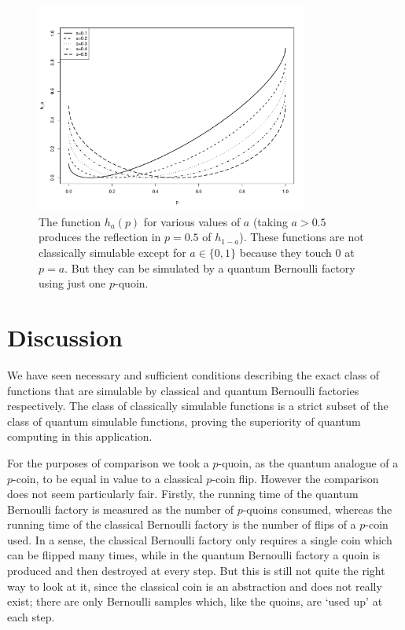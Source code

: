 \documentclass{article}
\theoremstyle{definition}
\begin{document}
\begin{figure}
\centering
\includegraphics[width=0.8\textwidth]{function_ha.pdf}
\caption{The function $h_a(p)$ for various values of $a$ (taking $a>0.5$ produces the reflection in $p=0.5$ of $h_{1-a}$). These functions are not classically simulable except for $a\in\{0,1\}$ because they touch 0 at $p=a$. But they can be simulated by a quantum Bernoulli factory using just one $p$-quoin.}
\label{fig:function_ha}
\end{figure}


\section{Discussion}\label{sec:discussion}
We have seen necessary and sufficient conditions describing the exact class of functions that are simulable by classical and quantum Bernoulli  factories respectively.
The class of classically simulable functions is a strict subset of the class of quantum simulable functions, proving the superiority of quantum computing in this application.

For the purposes of comparison we took a $p$-quoin, as the quantum analogue of a $p$-coin, to be equal in value to a classical $p$-coin flip.
However the comparison does not seem particularly fair. 
Firstly, the running time of the quantum Bernoulli factory is measured as the number of $p$-quoins consumed, whereas the running time of the classical Bernoulli factory is the number of flips of a $p$-coin used. In a sense, the classical Bernoulli factory only requires a single coin which can be flipped many times, while in the quantum Bernoulli factory a quoin is produced and then destroyed at every step.
But this is still not quite the right way to look at it, since the classical coin is an abstraction and does not really exist; there are only Bernoulli samples which, like the quoins, are `used up' at each step.
\end{document}
